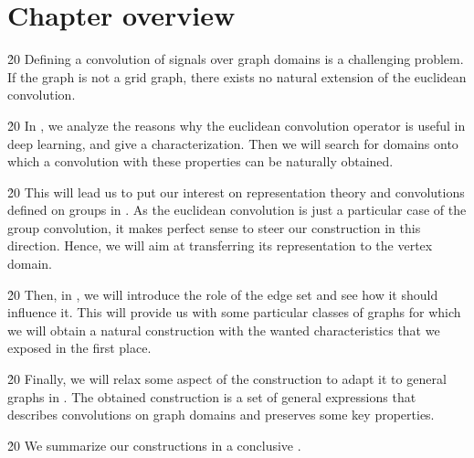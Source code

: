 \section*{Chapter overview}

\h{20}
Defining a convolution of signals over graph domains is a challenging problem. If the graph is not a grid graph, there exists no natural extension of the euclidean convolution.

\h{20}
In , we analyze the reasons why the euclidean convolution operator is useful in deep learning, and give a characterization. Then we will search for domains onto which a convolution with these properties can be naturally obtained.

\h{20}
This will lead us to put our interest on representation theory and convolutions defined on groups in . As the euclidean convolution is just a particular case of the group convolution, it makes perfect sense to steer our construction in this direction. Hence, we will aim at transferring its representation to the vertex domain.%

\h{20}
Then, in , we will introduce the role of the edge set and see how it should influence it. This will provide us with some particular classes of graphs for which we will obtain a natural construction with the wanted characteristics that we exposed in the first place.

\h{20}
Finally, we will relax some aspect of the construction to adapt it to general graphs in . The obtained construction is a set of general expressions that describes convolutions on graph domains and preserves some key properties.

\h{20}
We summarize our constructions in a conclusive .